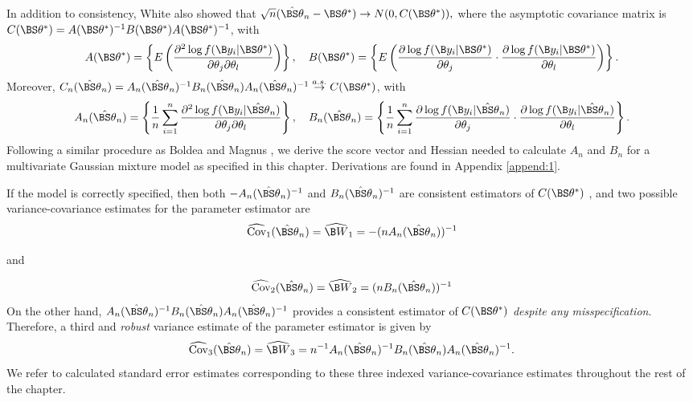 In addition to consistency, White \cite{white1982} also showed that $\sqrt{n}(\hat{\BS\theta}_{n}-\BS\theta^{*})\rightarrow N(0, C(\BS\theta^{*})),$ where the asymptotic covariance matrix is
$C(\BS\theta^{*})=A(\BS\theta^{*})^{-1}B(\BS\theta^{*})A(\BS\theta^{*})^{-1}$, with
$$A(\BS\theta^{*})=\left\{E\left(\frac{\partial^{2}\log f(\B y_{i}|\BS\theta^{*})}{\partial \theta_{j}\partial\theta_{l}}\right)\right\},\quad B(\BS\theta^{*})=\left\{E\left(\frac{\partial\log f(\B y_{i}|\BS\theta^{*})}{\partial \theta_{j}}\cdot \frac{\partial\log f(\B y_{i}|\BS\theta^{*})}{\partial \theta_{l}}\right)\right\}.$$
Moreover, $C_{n}(\hat{\BS\theta}_{n})=A_{n}(\hat{\BS\theta}_{n})^{-1}B_{n}(\hat{\BS\theta}_{n})A_{n}(\hat{\BS\theta}_{n})^{-1}\stackrel{a.s.}{\rightarrow} C(\BS\theta^{*})$, with
$$A_{n}(\hat{\BS\theta}_{n})=\left\{\frac{1}{n}\sum^{n}_{i=1}\frac{\partial^{2}\log f(\B y_{i}|\hat{\BS\theta}_{n})}{\partial \theta_{j}\partial\theta_{l}}\right\},\quad B_{n}(\hat{\BS\theta}_{n})=\left\{\frac{1}{n}\sum^{n}_{i=1}\frac{\partial\log f(\B y_{i}|\hat{\BS\theta}_{n})}{\partial \theta_{j}}\cdot \frac{\partial\log f(\B y_{i}|\hat{\BS\theta}_{n})}{\partial \theta_{l}}\right\}.$$
 Following a similar procedure as Boldea and Magnus \cite{boldea2009}, we derive the score vector and Hessian needed to calculate $A_{n}$ and $B_{n}$ for a multivariate Gaussian mixture model as specified in this chapter. Derivations are found in Appendix \ref{append:1}.
 
If the model is correctly specified, then both $-A_{n}(\hat{\BS\theta}_{n})^{-1}$ and $B_{n}(\hat{\BS\theta}_{n})^{-1}$ are consistent estimators of $C(\BS\theta^{*})$ \cite{white1982}, and two possible variance-covariance estimates for the parameter estimator are
$$\widehat{\text{Cov}}_{1}(\hat{\BS\theta}_{n}) = \widehat{\B W}_{1}=-(nA_{n}(\hat{\BS\theta}_{n}))^{-1}$$
\begin{center}and\end{center}
$$\widehat{\text{Cov}}_{2}(\hat{\BS\theta}_{n})= \widehat{\B W}_{2}=(nB_{n}(\hat{\BS\theta}_{n}))^{-1}$$
On the other hand, $A_{n}(\hat{\BS\theta}_{n})^{-1}B_{n}(\hat{\BS\theta}_{n})A_{n}(\hat{\BS\theta}_{n})^{-1}$ provides a consistent estimator of $C(\BS\theta^{*})$ {\em despite any misspecification}. Therefore, a third and {\em robust} variance estimate of the parameter estimator is given by
$$\widehat{\text{Cov}}_{3}(\hat{\BS\theta}_{n})= \widehat{\B W}_{3}=n^{-1}A_{n}(\hat{\BS\theta}_{n})^{-1}B_{n}(\hat{\BS\theta}_{n})A_{n}(\hat{\BS\theta}_{n})^{-1}.$$
 We refer to calculated standard error estimates corresponding to these three indexed variance-covariance estimates throughout the rest of the chapter.
 
